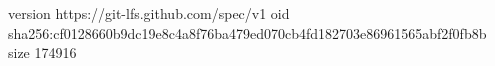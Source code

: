 version https://git-lfs.github.com/spec/v1
oid sha256:cf0128660b9dc19e8c4a8f76ba479ed070cb4fd182703e86961565abf2f0fb8b
size 174916
